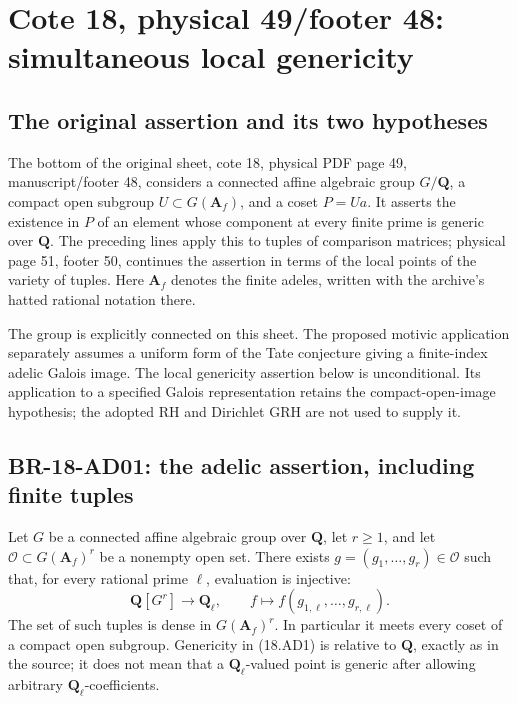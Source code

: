 \documentclass[11pt,a4paper]{article}
\theoremstyle{definition}\newtheorem{definition}[theorem]{Definition}
\theoremstyle{remark}\newtheorem{remark}[theorem]{Remark}
\begin{document}

\section{Cote 18, physical 49/footer 48: simultaneous local genericity}

\subsection{The original assertion and its two hypotheses}
The bottom of the original sheet, cote 18, physical PDF page 49,
manuscript/footer 48, considers a connected affine algebraic group
\(G/\mathbf Q\), a compact open subgroup
\(U\subset G(\mathbf A_f)\), and a coset \(P=Ua\).
It asserts the existence in \(P\) of an element whose component at
every finite prime is generic over \(\mathbf Q\).  The preceding
lines apply this to tuples of comparison matrices; physical page 51,
footer 50, continues the assertion in terms of the local points of
the variety of tuples.  Here \(\mathbf A_f\) denotes the finite
adeles, written with the archive's hatted rational notation there.

The group is explicitly connected on this sheet.  The proposed
motivic application separately assumes a uniform form of the Tate
conjecture giving a finite-index adelic Galois image.  The local
genericity assertion below is unconditional.  Its application to a
specified Galois representation retains the compact-open-image
hypothesis; the adopted RH and Dirichlet GRH are not used to supply it.

\subsection{BR-18-AD01: the adelic assertion, including finite tuples}
Let \(G\) be a connected affine algebraic group over \(\mathbf Q\),
let \(r\geq1\), and let
\(\mathcal O\subset G(\mathbf A_f)^r\) be a nonempty open set.
There exists \(g=(g_1,\ldots,g_r)\in\mathcal O\) such that,
for every rational prime \(\ell\), evaluation is injective:
\[
 \mathbf Q[G^r]\longrightarrow\mathbf Q_\ell,
 \qquad f\longmapsto f(g_{1,\ell},\ldots,g_{r,\ell}).
 \tag{18.AD1}
\]
The set of such tuples is dense in \(G(\mathbf A_f)^r\).
In particular it meets every coset of a compact open subgroup.
Genericity in (18.AD1) is relative to \(\mathbf Q\), exactly as in
the source; it does not mean that a \(\mathbf Q_\ell\)-valued point
is generic after allowing arbitrary \(\mathbf Q_\ell\)-coefficients.
\end{document}
